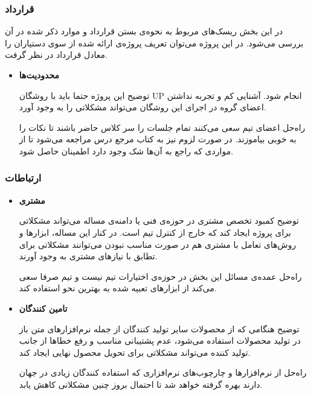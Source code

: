 \subsubsection{قرارداد}

در این بخش ریسک‌های مربوط به نحوه‌ی بستن قرارداد و موارد ذکر شده در آن بررسی می‌شود.
در این پروژه می‌توان تعریف پروژه‌ی ارائه شده از سوی دستیاران را معادل قرارداد در نظر گرفت.

\begin{itemize}
	
	\item 
	\textbf{محدودیت‌ها}

	توضیح \hspace*{1cm} 
این پروژه حتما باید با روشگان UP انجام شود.
آشنایی کم و تجربه نداشتن اعضای گروه در اجرای این روشگان می‌تواند مشکلاتی را به وجود آورد.
	
	راه‌حل \hspace*{1cm} 
اعضای تیم سعی می‌کنند تمام جلسات را سر کلاس حاضر باشند تا نکات را به خوبی بیاموزند.
در صورت لزوم نیز به کتاب مرجع درس مراجعه می‌شود تا از مواردی که راجع به آن‌ها شک وجود دارد اطمینان حاصل شود.
	
\end{itemize}

\subsubsection{ارتباطات}

\begin{itemize}
	
	\item 
	\textbf{مشتری}

	توضیح \hspace*{1cm} 
کمبود تخصص مشتری در حوزه‌ی فنی یا دامنه‌ی مساله می‌تواند مشکلاتی برای پروژه ایجاد کند که خارج از کنترل تیم است.
در کنار این مساله، ابزارها و روش‌های تعامل با مشتری هم در صورت مناسب نبودن می‌توانند مشکلاتی برای تطابق با نیازهای مشتری به وجود آورند.
	
	راه‌حل \hspace*{1cm} 
عمده‌ی مسائل این بخش در حوزه‌ی اختیارات تیم نیست و تیم صرفا سعی می‌کند از ابزارهای تعبیه شده به بهترین نحو استفاده کند.

	\item 
	\textbf{تامین کنندگان}

	توضیح \hspace*{1cm} 
هنگامی که از محصولات سایر تولید کنندگان از جمله نرم‌افزارهای متن باز در تولید محصولات استفاده می‌شود، عدم پشتیبانی مناسب و رفع خطاها از جانب تولید کننده می‌تواند مشکلاتی برای تحویل محصول نهایی ایجاد کند.

	راه‌حل \hspace*{1cm} 
از نرم‌افزارها و چارچوب‌های نرم‌افزاری که استفاده کنندگان زیادی در جهان دارند بهره گرفته خواهد شد تا احتمال بروز چنین مشکلاتی کاهش یابد.
	
\end{itemize}


